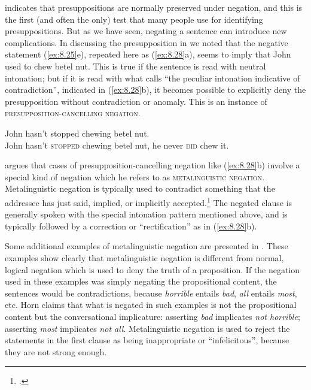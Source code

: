  indicates that presuppositions are normally preserved under negation, and this is the first (and often the only) test that many people use for identifying presuppositions. But as we have seen, negating a sentence can introduce new complications. In discussing the presupposition in  we noted that the negative statement (\ref{ex:8.25}e), repeated here as (\ref{ex:8.28}a), seems to imply that John used to chew betel nut. This is true if the sentence is read with neutral intonation; but if it is read with what \citet{Jespersen1933} calls “the peculiar intonation indicative of contradiction”, indicated in (\ref{ex:8.28}b), it becomes possible to explicitly deny the presupposition without contradiction or anomaly. This is an instance of \textsc{presupposition-cancelling negation}.

\ea \label{ex:8.28}
\ea John hasn’t stopped chewing betel nut.\\
\ex John hasn’t \textsc{stopped} chewing betel nut, he never \textsc{did} chew it.
                       \z
\z

\citet{Horn1985,Horn1989} argues that cases of presupposition-cancelling negation like (\ref{ex:8.28}b) involve a special kind of negation which he refers to as \textsc{metalinguistic} \textsc{negation}. Metalinguistic negation is typically used to contradict something that the addressee has just said, implied, or implicitly accepted.\footnote{\citet[46--47]{KarttunenPeters1979}.} The negated clause is generally spoken with the special intonation pattern mentioned above, and is typically followed by a correction or “rectification” as in (\ref{ex:8.28}b).



Some additional examples of metalinguistic negation are presented in . These examples show clearly that metalinguistic negation is different from normal, logical negation which is used to deny the truth of a proposition. If the negation used in these examples was simply negating the propositional content, the sentences would be contradictions, because \textit{horrible} entails \textit{bad}, \textit{all} entails \textit{most}, etc. Horn claims that what is negated in such examples is not the propositional content but the conversational implicature: asserting \textit{bad} implicates \textit{not horrible}; asserting \textit{most} implicates \textit{not all}. Metalinguistic negation is used to reject the statements in the first clause as being inappropriate or “infelicitous”, because they are not strong enough.


